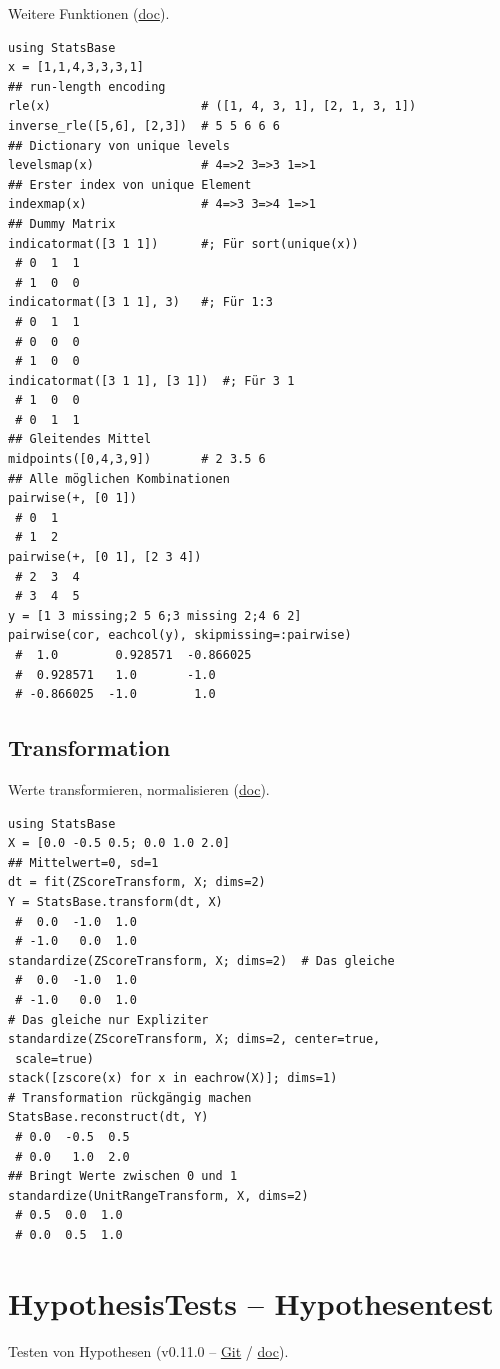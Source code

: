 \documentclass[10pt,twocolumn]{scrartcl}
\begin{document}
Weitere Funktionen
(\href{https://juliastats.org/StatsBase.jl/stable/misc/}{doc}).

\begin{lstlisting}
using StatsBase
x = [1,1,4,3,3,3,1]
## run-length encoding
rle(x)                     # ([1, 4, 3, 1], [2, 1, 3, 1])
inverse_rle([5,6], [2,3])  # 5 5 6 6 6
## Dictionary von unique levels
levelsmap(x)               # 4=>2 3=>3 1=>1
## Erster index von unique Element
indexmap(x)                # 4=>3 3=>4 1=>1
## Dummy Matrix
indicatormat([3 1 1])      #; Für sort(unique(x))
 # 0  1  1
 # 1  0  0
indicatormat([3 1 1], 3)   #; Für 1:3
 # 0  1  1
 # 0  0  0
 # 1  0  0
indicatormat([3 1 1], [3 1])  #; Für 3 1
 # 1  0  0
 # 0  1  1
## Gleitendes Mittel
midpoints([0,4,3,9])       # 2 3.5 6
## Alle möglichen Kombinationen
pairwise(+, [0 1])
 # 0  1
 # 1  2
pairwise(+, [0 1], [2 3 4])
 # 2  3  4
 # 3  4  5
y = [1 3 missing;2 5 6;3 missing 2;4 6 2]
pairwise(cor, eachcol(y), skipmissing=:pairwise)
 #  1.0        0.928571  -0.866025
 #  0.928571   1.0       -1.0
 # -0.866025  -1.0        1.0
\end{lstlisting}

\subsection{Transformation}

Werte transformieren, normalisieren
(\href{https://juliastats.org/StatsBase.jl/stable/transformations/}{doc}).

\begin{lstlisting}
using StatsBase
X = [0.0 -0.5 0.5; 0.0 1.0 2.0]
## Mittelwert=0, sd=1
dt = fit(ZScoreTransform, X; dims=2)
Y = StatsBase.transform(dt, X)
 #  0.0  -1.0  1.0
 # -1.0   0.0  1.0
standardize(ZScoreTransform, X; dims=2)  # Das gleiche
 #  0.0  -1.0  1.0
 # -1.0   0.0  1.0
# Das gleiche nur Expliziter
standardize(ZScoreTransform, X; dims=2, center=true,
 scale=true)
stack([zscore(x) for x in eachrow(X)]; dims=1)
# Transformation rückgängig machen
StatsBase.reconstruct(dt, Y)
 # 0.0  -0.5  0.5
 # 0.0   1.0  2.0
## Bringt Werte zwischen 0 und 1
standardize(UnitRangeTransform, X, dims=2)
 # 0.5  0.0  1.0
 # 0.0  0.5  1.0
\end{lstlisting}

\section{HypothesisTests -- Hypothesentest}

Testen von Hypothesen (v0.11.0 --
\href{https://github.com/JuliaStats/HypothesisTests.jl}{Git} /
\href{https://juliastats.org/HypothesisTests.jl/stable/}{doc}).
\end{document}
